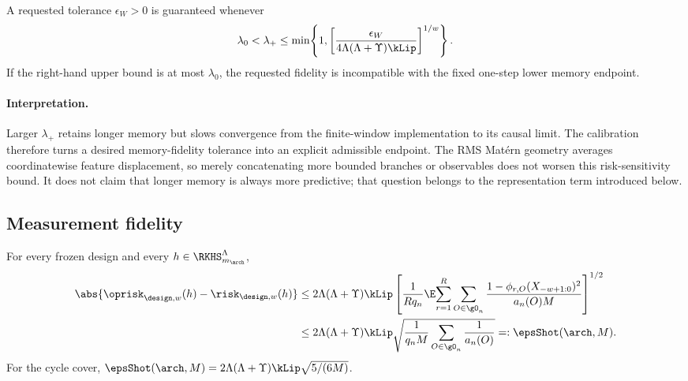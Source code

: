 \begin{corollary}
\label{cor:lambda-plus-calibration}
A requested tolerance $\epsilon_W>0$ is guaranteed whenever
\begin{equation}
    \lambda_0<\lambda_+\leq
    \min\!\left\{1,
    \left[\frac{\epsilon_W}
      {4\Lambda(\Lambda+\Upsilon)\kLip}
    \right]^{1/w}\right\}.
    \label{eq:lambda-plus-calibration-condition}
\end{equation}
If the right-hand upper bound is at most $\lambda_0$, the requested fidelity
is incompatible with the fixed one-step lower memory endpoint.
\end{corollary}

\paragraph{Interpretation.}
Larger $\lambda_+$ retains longer memory but slows convergence from the
finite-window implementation to its causal limit.  The calibration therefore
turns a desired memory-fidelity tolerance into an explicit admissible endpoint.
The RMS Mat\'ern geometry averages coordinatewise feature displacement, so
merely concatenating more bounded branches or observables does not worsen this
risk-sensitivity bound.  It does not claim that longer memory is always more
predictive; that question belongs to the representation term introduced below.

\subsection{Measurement fidelity}
\label{sec:measurement-fidelity}

\begin{proposition}
\label{prop:shot-certificate}
For every frozen design and every $h\in\RKHS_{m_{\arch}}^\Lambda$,
\begin{equation}
\begin{aligned}
    \abs{\oprisk_{\design,w}(h)-\risk_{\design,w}(h)}
    &\leq
    2\Lambda(\Lambda+\Upsilon)\kLip
    \left[
      \frac1{Rq_n}\E\!\sum_{r=1}^{R}\sum_{O\in\gO_n}
      \frac{1-\phi_{r,O}(X_{-w+1:0})^2}{a_n(O)M}
    \right]^{1/2}\\
    &\leq
    2\Lambda(\Lambda+\Upsilon)\kLip
      \sqrt{\frac{1}{q_nM}\sum_{O\in\gO_n}\frac1{a_n(O)}}
      =:\epsShot(\arch,M).
\end{aligned}
    \label{eq:operational-exact-risk-bound}
\end{equation}
For the cycle cover,
$\epsShot(\arch,M)=2\Lambda(\Lambda+\Upsilon)\kLip\sqrt{5/(6M)}$.
\end{proposition}

